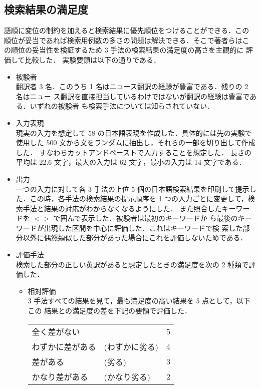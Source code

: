 \subsection{検索結果の満足度}
\vspace*{-0.5mm}
\label{sec:manzoku}
語順に変位の制約を加えると検索結果に優先順位をつけることができる．この
順位が妥当であれば検索用例数の多さの問題は解決できる．そこで著者らはこ
の順位の妥当性を検証するため 3 手法の検索結果の満足度の高さを主観的に
評価して比較した．
実験要領は以下の通りである．
\begin{itemize}
\item 被験者\\
翻訳者 3 名．このうち 1 名はニュース翻訳の経験が豊富である．残りの 2 名はニュー
ス翻訳を直接担当しているわけではないが翻訳の経験は豊富である．いずれの被験者
も検索手法については知らされていない．
\item 入力表現\\
現実の入力を想定して 58 の日本語表現を作成した．具体的には先の実験で
使用した 500 文から文をランダムに抽出し，それらの一部を切り出して作成した．
すなわちカットアンドペーストで入力することを想定した．
長さの平均は 22.6 文字，最大の入力は 62 文字，最小の入力は 14 文字である．
\item 出力\\
一つの入力に対して各 3 手法の上位 5 個の日本語検索結果を印刷して提示し
た．この時，各手法の検索結果の提示順序を 1 つの入力ごとに変更して，検
索手法と結果の対応がわからなくなるようにした．
また照合したキーワードを $<>$ で囲んで表示した．被験者は最初のキーワードか
ら最後のキーワードが出現した区間を中心に評価した．これはキーワードで検
索した部分以外に偶然類似した部分があった場合にこれを評価しないためである．
\item 評価手法\\
 検索した部分の正しい英訳があると想定したときの満足度を次の 2 種類で評
価した．
 \begin{itemize}
  \item 相対評価\\
   3 手法すべての結果を見て，最も満足度の高い結果を 5 点として，以下この
結果との満足度の差を下記の要領で評価した．
   \begin{center}
   \begin{tabular}{llr}
        全く差がない &  & 5\\
        わずかに差がある & (わずかに劣る) & 4\\
        差がある & (劣る) & 3\\
        かなり差がある & (かなり劣る) & 2\\

\end{tabular}
\end{center}
\end{itemize}
\end{itemize}
